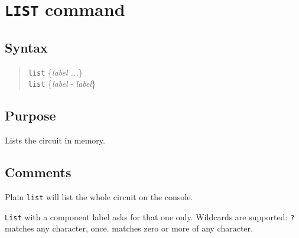 %
%
%
%
\section{{\tt LIST} command}
\subsection{Syntax}
\begin{verse}
{\tt list} \{{\it label ...}\} \\
{\tt list} \{{\it label} - {\it label}\}
\end{verse}
\subsection{Purpose}

Lists the circuit in memory.
\subsection{Comments}

Plain {\tt list} will list the whole circuit on the console.

{\tt List} with a component label asks for that one only.  Wildcards are
supported: {\tt ?} matches any character, once.  {\tt *} matches zero or
more of any character.

